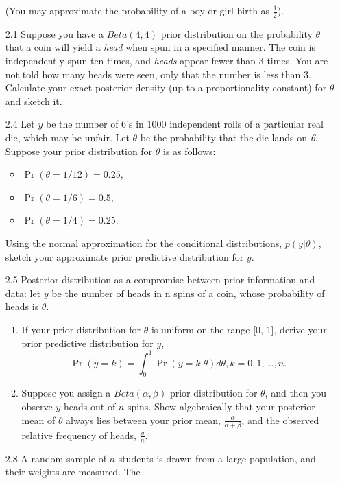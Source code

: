\documentclass[12pt,a4paper,twoside]{article}
\begin{document}
\begin{enumerate}
    (You may approximate the probability of a boy or girl birth as $\frac{1}{2}$)\cite{Chapter1Exercises}.
    \item[2.1] Suppose you have a $Beta(4, 4)$ prior distribution on the probability $\theta$ that a coin will yield a \textit{head} when
    spun in a specified manner. The coin is independently spun ten times, and \textit{heads} appear fewer than 3 times. You are not
    told how many heads were seen, only that the number is less than 3. Calculate your exact posterior density (up to a proportionality
    constant) for $\theta$ and sketch it\cite{Chapter2Exercises}.
    \item[2.4] Let $y$ be the number of 6's in $1000$ independent rolls of a particular real die, which may be unfair. Let $\theta$ be the
    probability that the die lands on \textit{6}. Suppose your prior distribution for $\theta$ is as follows\cite{Chapter2Exercises}:
    \begin{itemize} 
        \item $\Pr(\theta = 1/12) = 0.25$,
        \item $\Pr(\theta = 1/6) = 0.5$,
        \item $\Pr(\theta = 1/4) = 0.25$.
    \end{itemize}
    Using the normal approximation for the conditional distributions, $p(y|\theta)$, sketch your approximate prior predictive distribution
    for $y$.
    \item[2.5] Posterior distribution as a compromise between prior information and data: let $y$ be the number of heads in n spins of a coin,
    whose probability of heads is $\theta$\cite{Chapter2Exercises}.
    \begin{enumerate}[label=$(\alph*)$]
        \item If your prior distribution for $\theta$ is uniform on the range [0, 1], derive your prior predictive distribution for $y$,
        \[
        \Pr(y = k) = \int_{0}^{1} \Pr(y = k|\theta) d\theta, k = 0, 1, . . . , n.
        \]
        \item Suppose you assign a $Beta(\alpha, \beta)$ prior distribution for $\theta$, and then you observe $y$ heads
        out of $n$ spins. Show algebraically that your posterior mean of $\theta$ always lies between your prior mean,
        $\frac{\alpha}{\alpha + \beta}$, and the observed relative frequency of heads, $\frac{y}{n}$.
    \end{enumerate}
    \item[2.8] A random sample of $n$ students is drawn from a large population, and their weights are measured. The

\end{enumerate}
\end{document}
